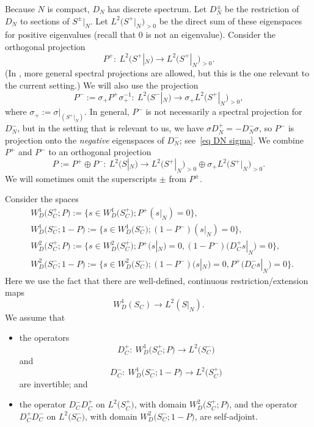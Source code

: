 \documentclass[pdftex]{sigma}%
\numberwithin{equation}{section}
\begin{document}
Because $N$ is compact, $D_N$ has discrete spectrum.
Let $D_N^{\pm}$ be the restriction of $D_N$ to sections of $S^{\pm}|_N$.
 Let $L^2\big(S^+|_N\big)_{>0}$ be the direct sum of these eigenspaces for positive eigenvalues (recall that $0$ is not an eigenvalue).
 Consider the orthogonal projection
\begin{equation} \label{eq def P+}
P^+\colon\ L^2\big(S^+|_N\big) \to L^2\big(S^+|_N\big)_{>0}.
\end{equation}
(In \cite{HW21a}, more general spectral projections are allowed, but this is the one relevant to the current setting.)
We will also use the projection
\[
P^- := \sigma_+ P^+ \sigma_+^{-1} \colon\ L^2\big(S^-|_N\big) \to \sigma_+L^2\big(S^+|_N\big)_{>0},
\]
where $\sigma_+:= \sigma|_{(S^+|_N)}$.
In general, $P^-$ is not necessarily a spectral projection for $D_N^-$, but in the setting that is relevant to us, we have $\sigma D_N^+ = -D_N^- \sigma$, so $P^-$ is projection onto the \emph{negative} eigenspaces of $D_N^-$; see~\eqref{eq DN sigma}.
We combine $P^+$ and $P^-$ to an orthogonal projection
\begin{equation} \label{eq def P}
P := P^+ \oplus P^-\colon \ L^2(S|_N) \to L^2\big(S^+|_N\big)_{>0} \oplus
\sigma_+L^2\big(S^+|_N\big)_{>0}.
\end{equation}
We
 will sometimes omit the superscripts $\pm$ from $P^{\pm}$.

Consider the spaces
\begin{equation} \label{eq def WnD}
\begin{split}
&W^1_D\big(S_C^+; P\big):= \big\{s \in W^1_D\big(S_C^+\big); P^+(s|_N) = 0\big\},\\[1mm]
&W^1_D\big(S_C^-;1- P\big) := \big\{s \in W^1_D\big(S_C^-\big); (1-P^-)(s|_N) = 0\big\},\\[1mm]
&W^2_D\big(S_C^+; P\big) := \big\{s \in W^2_D\big(S_C^+\big); P^+(s|_N) = 0, (1-P^-)\big(D^+_Cs|_N\big) = 0\big\},\\[1mm]
&W^2_D\big(S_C^-; 1-P\big) := \big\{s \in W^2_D\big(S_C^-\big); (1-P^-)(s|_N) = 0, P^+\big(D^-_Cs|_N\big) = 0\big\}.
\end{split}
\end{equation}
Here we use the fact that there are well-defined, continuous restriction/extension maps
\[
{W^1_D(S_C) \to L^2(S|_N)}.
\]
We assume that
\begin{itemize}\itemsep=0pt
\item the operators
\begin{equation} \label{eq DC+}
D^+_C\colon\ W^1_D\big(S_C^+; P\big) \to L^2\big(S_C^-\big)
\end{equation}
and
\begin{equation} \label{eq DC-}
D^-_C\colon\ W^1_D\big(S_C^-; 1-P\big) \to L^2\big(S_C^+\big)
\end{equation}
are invertible; and
\item the operator $D^-_C D_C^+$ on $L^2\big(S_C^+\big)$, with domain $W^2_D\big(S_C^+; P\big)$, and the operator $D^+_C D_C^-$ on $L^2\big(S_C^-\big)$, with domain $W^2_D\big(S_C^-; 1-P\big)$, are self-adjoint.
\end{itemize}
\end{document}
